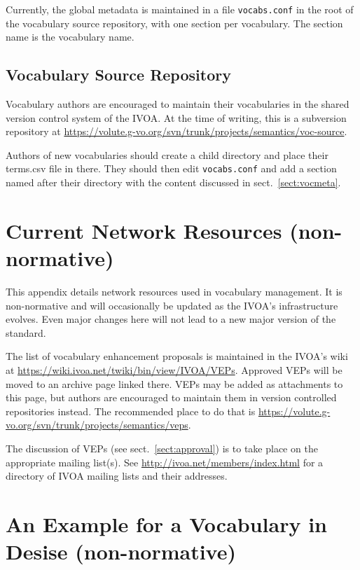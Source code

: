 \documentclass[11pt,a4paper]{ivoa}
\begin{document}
Currently, the global metadata is maintained in a file
\verb|vocabs.conf| in the root of the vocabulary source repository, with one
section per vocabulary.  The section name is the vocabulary name.

\subsection{Vocabulary Source Repository}

Vocabulary authors are encouraged to maintain their vocabularies in the
shared version control system of the IVOA.  At the time of writing, this
is a subversion repository at
\url{https://volute.g-vo.org/svn/trunk/projects/semantics/voc-source}.

Authors of new vocabularies should create a child directory and place
their terms.csv file in there.  They should then edit \verb|vocabs.conf|
and add a section named after their directory with the content discussed
in sect.~\ref{sect:vocmeta}.


\section{Current Network Resources (non-normative)}
\label{app:curtech}

This appendix details network resources used in vocabulary management.
It is non-normative and will occasionally be updated as the IVOA's
infrastructure evolves.  Even major changes here will not lead to a new
major version of the standard.

The list of vocabulary enhancement proposals is maintained in the IVOA's
wiki at
\url{https://wiki.ivoa.net/twiki/bin/view/IVOA/VEPs}.
Approved VEPs will be moved to an archive page linked there.
VEPs may be added as attachments to this page, but authors are
encouraged to maintain them in version controlled repositories instead.
The recommended place to do that is
\url{https://volute.g-vo.org/svn/trunk/projects/semantics/veps}.

The discussion of VEPs (see sect.~\ref{sect:approval}) is to take place
on the appropriate  mailing list(s).  See
\url{http://ivoa.net/members/index.html} for a directory of IVOA mailing
lists and their addresses.

\section{An Example for a Vocabulary in Desise (non-normative)}
\label{app:desiseexample}
\end{document}
